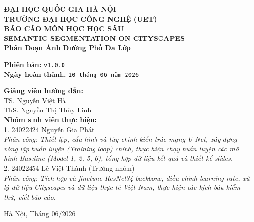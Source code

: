 \documentclass[a4paper,12pt]{report}
\begin{document}
\begin{titlepage}
    \centering
    \vspace*{0.5cm}
    \Large \textbf{ĐẠI HỌC QUỐC GIA HÀ NỘI} \\
    \Large \textbf{TRƯỜNG ĐẠI HỌC CÔNG NGHỆ (UET)} \\
    \vspace{0.8cm}
    \Large \textbf{BÁO CÁO MÔN HỌC HỌC SÂU} \\
    \vspace{0.4cm}
    \huge \textbf{SEMANTIC SEGMENTATION ON CITYSCAPES} \\
    \Large \textbf{Phân Đoạn Ảnh Đường Phố Đa Lớp} \\
    \vspace{0.8cm}
    \begin{center}
        \textbf{Phiên bản:} \texttt{v1.0.0} \\
        \textbf{Ngày hoàn thành:} \texttt{10 tháng 06 năm 2026}
    \end{center}
    \vspace{0.8cm}
    \begin{flushleft}
        \Large
        \textbf{Giảng viên hướng dẫn:} \\
        \vspace{0.2cm}
        \quad \Large TS. Nguyễn Việt Hà \\
        \quad \Large ThS. Nguyễn Thị Thùy Linh \\
        \vspace{0.5cm}
        \textbf{Nhóm sinh viên thực hiện:} \\
        \normalsize
        \vspace{0.2cm}
        1. 24022424 Nguyễn Gia Phát \\
        \quad \textit{Phân công: Thiết lập, cấu hình và tùy chỉnh kiến trúc mạng U-Net, xây dựng vòng lặp huấn luyện (Training loop) chính, thực hiện chạy huấn luyện các mô hình Baseline (Model 1, 2, 5, 6), tổng hợp dữ liệu kết quả và thiết kế slides.} \\
        \vspace{0.2cm}
        2. 24022454 Lê Việt Thành (Trưởng nhóm) \\
        \quad \textit{Phân công: Tích hợp và finetune ResNet34 backbone, điều chỉnh learning rate, xử lý dữ liệu Cityscapes và dữ liệu thực tế Việt Nam, thực hiện các kịch bản kiểm thử, viết báo cáo.}
    \end{flushleft}
    \vfill
    \Large Hà Nội, Tháng 06/2026
\end{titlepage}
\end{document}
